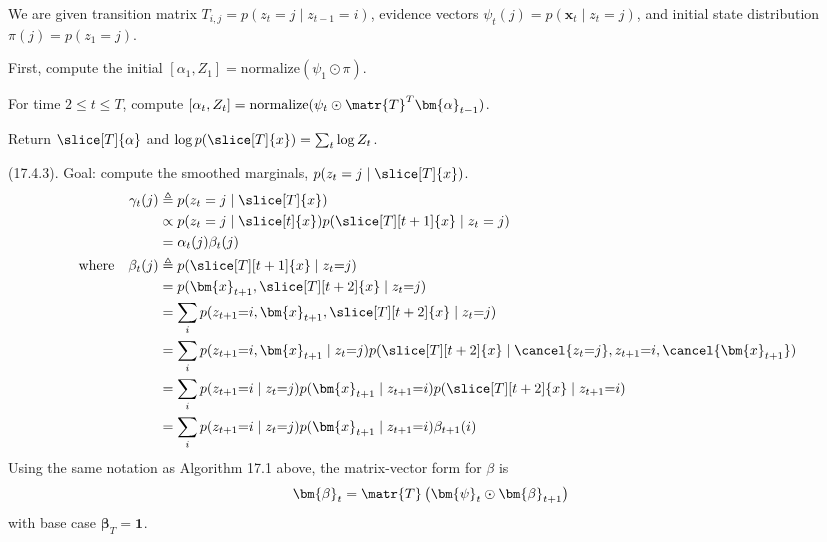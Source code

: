 \documentclass[11pt]{article}
\renewcommand\vec[2][]{\bm{#2}_{#1}}
\newcommand\myspace[1][]{\vspace{#1\bigskipamount}}
\newcommand\p{\Needspace{10\baselineskip} \noindent}
\begin{document}
\begin{algorithm}
	We are given transition matrix $T_{i,j} = p(z_t = j \mid z_{t-1} = i)$, evidence vectors $\psi_t(j) = p(\vec[t]{x} \mid z_t{=}j)$, and initial state distribution $\pi(j) = p(z_1 = j)$. 
	
	\begin{compactenum}
		\item First, compute the initial $[\alpha_1, Z_1] = \text{normalize}(\psi_1 \odot \pi)$. 
		
		\item For time $2 \le t \le T$, compute $[\alpha_t, Z_t] = \text{normalize}(\psi_t \odot \matr{T}^T \vec[t-1]{\alpha})$. 
		
		\item Return $\slice[T]{\alpha}$ and $\log p(\slice[T]{x}) = \sum_t \log Z_t$. 
	\end{compactenum} 
\end{algorithm}

\myspace
\p {} (17.4.3). Goal: compute the smoothed marginals, $p(z_t = j \mid \slice[T]{x})$. 
\begin{align}
	\gamma_t(j)
		&\triangleq p(z_t = j \mid \slice[T]{x})   \\
		&\propto p(z_t = j \mid \slice[t]{x}) p(\slice[T][t+1]{x} \mid z_t = j) \\
		&= \alpha_t(j) \beta_t(j) \\
	\text{where}\quad
	\beta_t(j)
		&\triangleq p(\slice[T][t+1]{x} \mid z_t {=} j)  \\
		&= p(\vec[t+1]{x}, \slice[T][t+2]{x} \mid z_t{=}j ) \\
		&= \sum_{i} p(z_{t+1}{=}i, \vec[t+1]{x}, \slice[T][t+2]{x} \mid z_t{=}j ) \\
		&= \sum_i p(z_{t+1}{=}i, \vec[t+1]{x} \mid z_t{=}j) p(\slice[T][t+2]{x} \mid \cancel{z_t{=}j}, z_{t+1}{=}i, \cancel{\vec[t+1]{x}} ) \\
		&= \sum_i p(z_{t+1}{=}i \mid z_t{=}j) p(\vec[t+1]{x} \mid z_{t+1}{=}i) p(\slice[T][t+2]{x} \mid z_{t+1}{=}i) \\
		&=  \sum_i p(z_{t+1}{=}i \mid z_t{=}j) p(\vec[t+1]{x} \mid z_{t+1}{=}i) \beta_{t+1}(i)
\end{align}
Using the same notation as Algorithm 17.1 above, the matrix-vector form for $\beta$ is
\begin{align}
	\vec[t]{\beta} &= \matr{T} \left( \vec[t]{\psi} \odot \vec[t+1]{\beta}  \right)
\end{align}
with base case $\vec[T]{\beta} = \vec{1}$. 
\end{document}
